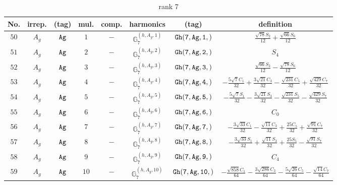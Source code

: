 \documentclass[fleqn,8pt]{jsarticle}
\begin{document}
\begin{table}[ht!]
\begin{center}
\caption{rank 7}
\renewcommand{\arraystretch}{1.3}
\begin{tabular}{cccccccc} \hline \hline
No. & irrep. & (tag) & mul. & comp. & harmonics & (tag) & definition \\ \hline
$ 50 $ & $ A_{g} $ & $ {\tt Ag} $ & $ 1 $ & $ - $ & $ \mathbb{G}_{7}^{(h,A_{g},1)} $ & $ {\tt Gh(7,Ag,1,)} $ & $ \frac{\sqrt{78} S_{2}}{12} + \frac{\sqrt{66} S_{6}}{12} $ \\
$ 51 $ & $ A_{g} $ & $ {\tt Ag} $ & $ 2 $ & $ - $ & $ \mathbb{G}_{7}^{(h,A_{g},2)} $ & $ {\tt Gh(7,Ag,2,)} $ & $ S_{4} $ \\
$ 52 $ & $ A_{g} $ & $ {\tt Ag} $ & $ 3 $ & $ - $ & $ \mathbb{G}_{7}^{(h,A_{g},3)} $ & $ {\tt Gh(7,Ag,3,)} $ & $ \frac{\sqrt{66} S_{2}}{12} - \frac{\sqrt{78} S_{6}}{12} $ \\
$ 53 $ & $ A_{g} $ & $ {\tt Ag} $ & $ 4 $ & $ - $ & $ \mathbb{G}_{7}^{(h,A_{g},4)} $ & $ {\tt Gh(7,Ag,4,)} $ & $ - \frac{5 \sqrt{7} C_{1}}{32} + \frac{3 \sqrt{21} C_{3}}{32} - \frac{\sqrt{231} C_{5}}{32} + \frac{\sqrt{429} C_{7}}{32} $ \\
$ 54 $ & $ A_{g} $ & $ {\tt Ag} $ & $ 5 $ & $ - $ & $ \mathbb{G}_{7}^{(h,A_{g},5)} $ & $ {\tt Gh(7,Ag,5,)} $ & $ - \frac{5 \sqrt{7} S_{1}}{32} - \frac{3 \sqrt{21} S_{3}}{32} - \frac{\sqrt{231} S_{5}}{32} - \frac{\sqrt{429} S_{7}}{32} $ \\
$ 55 $ & $ A_{g} $ & $ {\tt Ag} $ & $ 6 $ & $ - $ & $ \mathbb{G}_{7}^{(h,A_{g},6)} $ & $ {\tt Gh(7,Ag,6,)} $ & $ C_{0} $ \\
$ 56 $ & $ A_{g} $ & $ {\tt Ag} $ & $ 7 $ & $ - $ & $ \mathbb{G}_{7}^{(h,A_{g},7)} $ & $ {\tt Gh(7,Ag,7,)} $ & $ - \frac{3 \sqrt{33} C_{1}}{32} - \frac{\sqrt{11} C_{3}}{32} + \frac{25 C_{5}}{32} + \frac{\sqrt{91} C_{7}}{32} $ \\
$ 57 $ & $ A_{g} $ & $ {\tt Ag} $ & $ 8 $ & $ - $ & $ \mathbb{G}_{7}^{(h,A_{g},8)} $ & $ {\tt Gh(7,Ag,8,)} $ & $ - \frac{3 \sqrt{33} S_{1}}{32} + \frac{\sqrt{11} S_{3}}{32} + \frac{25 S_{5}}{32} - \frac{\sqrt{91} S_{7}}{32} $ \\
$ 58 $ & $ A_{g} $ & $ {\tt Ag} $ & $ 9 $ & $ - $ & $ \mathbb{G}_{7}^{(h,A_{g},9)} $ & $ {\tt Gh(7,Ag,9,)} $ & $ C_{4} $ \\
$ 59 $ & $ A_{g} $ & $ {\tt Ag} $ & $ 10 $ & $ - $ & $ \mathbb{G}_{7}^{(h,A_{g},10)} $ & $ {\tt Gh(7,Ag,10,)} $ & $ - \frac{\sqrt{858} C_{1}}{64} - \frac{3 \sqrt{286} C_{3}}{64} - \frac{5 \sqrt{26} C_{5}}{64} - \frac{\sqrt{14} C_{7}}{64} $ \\

\end{tabular}
\end{center}
\end{table}
\end{document}
